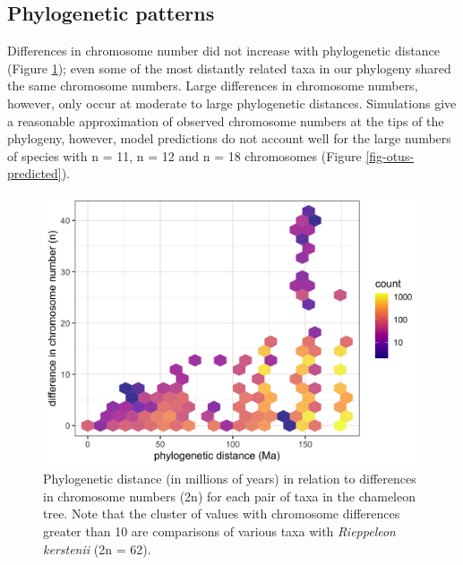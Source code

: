 \documentclass[a4paper, 12pt]{article}
\begin{document}
\subsection{Phylogenetic patterns}
Differences in chromosome number did not increase with phylogenetic distance (Figure \ref{fig-otus-pairwise}); even some of the most distantly related taxa in our phylogeny shared the same chromosome numbers. Large differences in chromosome numbers, however, only occur at moderate to large phylogenetic distances. Simulations give a reasonable approximation of observed chromosome numbers at the tips of the phylogeny, however, model predictions do not account well for the large numbers of species with n = 11, n = 12 and n = 18 chromosomes (Figure \ref{fig-otus-predicted}). 

\newpage
\begin{figure}[H]
 \centering
  \includegraphics[width = \linewidth]{figures/taxon-pairs-distances.png}
  \caption{Phylogenetic distance (in millions of years) in relation to differences in chromosome numbers (2n) for each pair of taxa in the chameleon tree. Note that the cluster of values with chromosome differences greater than 10 are comparisons of various taxa with \textit{Rieppeleon kerstenii} (2n = 62).
}
  \label{fig-otus-pairwise}
\end{figure} 
\end{document}
